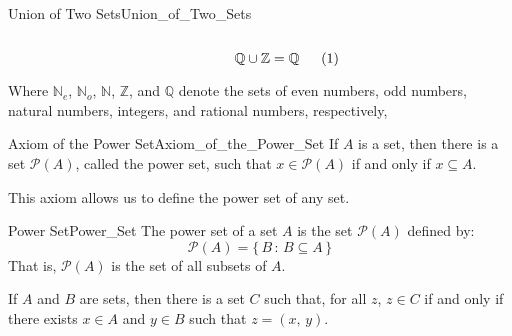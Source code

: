 \begin{lexample}{Union of Two Sets}{Union_of_Two_Sets}
\begin{subequations}
\begin{minipage}[b]{0.30\textwidth}
                \end{minipage}
                \hspace{0.03\textwidth}
                \begin{minipage}[b]{0.30\textwidth}
                    \centering
                    \begin{equation}
                        \mathbb{Q}\cup\mathbb{Z}=\mathbb{Q}
                    \end{equation}
                \end{minipage}
            \end{subequations}
            \par\vspace{2.5ex}
            Where $\mathbb{N}_{e}$, $\mathbb{N}_{o}$, $\mathbb{N}$,
            $\mathbb{Z}$, and $\mathbb{Q}$ denote the sets of even numbers,
            odd numbers, natural numbers, integers, and rational numbers,
            respectively,
        \end{lexample}
        \begin{faxiom}{Axiom of the Power Set}{Axiom_of_the_Power_Set}
            If $A$ is a set, then there is a set $\mathcal{P}(A)$, called the
            power set, such that $x\in\mathcal{P}(A)$ if and only if
            $x\subseteq{A}$.
        \end{faxiom}
        This axiom allows us to define the power set of any set.
        \begin{ldefinition}{Power Set}{Power_Set}
            The power set of a set $A$ is the set
            $\mathcal{P}(A)$ defined by:
            \begin{equation}
                \mathcal{P}(A)=\{\,B\,:\,B\subseteq{A}\,\}
            \end{equation}
            That is, $\mathcal{P}(A)$ is the set of all subsets of $A$.
        \end{ldefinition}
        \begin{theorem}
            \label{thm:Cartesian_Product_Exists}%
            If $A$ and $B$ are sets, then there is a set $C$ such that, for
            all $z$, $z\in{C}$ if and only if there exists $x\in{A}$ and
            $y\in{B}$ such that $z=(x,\,y)$.
        \end{theorem}
